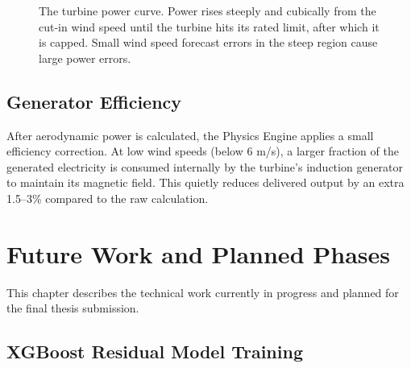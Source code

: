 \documentclass[12pt,a4paper]{report}
\begin{document}
\begin{figure}[H]
    \centering
    \caption{The turbine power curve. Power rises steeply and cubically from the cut-in wind speed until the turbine hits its rated limit, after which it is capped. Small wind speed forecast errors in the steep region cause large power errors.}
\end{figure}

\section{Generator Efficiency}

After aerodynamic power is calculated, the Physics Engine applies a small efficiency correction. At low wind speeds (below 6 m/s), a larger fraction of the generated electricity is consumed internally by the turbine's induction generator to maintain its magnetic field. This quietly reduces delivered output by an extra 1.5--3\% compared to the raw calculation.

\chapter{Future Work and Planned Phases}

This chapter describes the technical work currently in progress and planned for the final thesis submission.

\section{XGBoost Residual Model Training}
\end{document}
